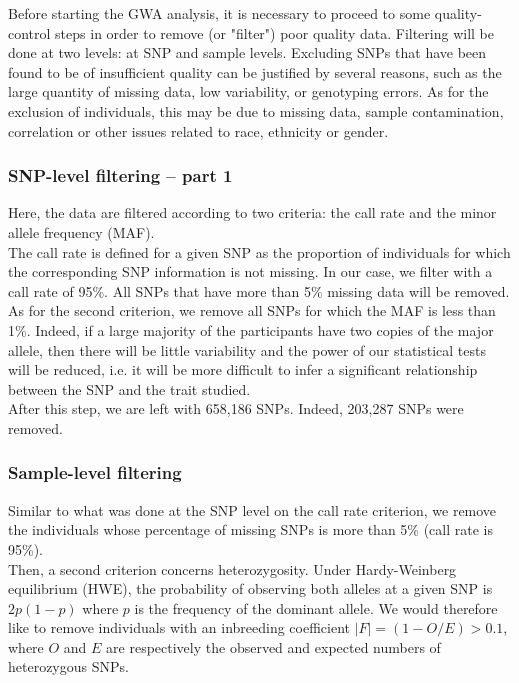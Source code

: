 \documentclass[a4paper, 12pt]{article}
\begin{document}
Before starting the GWA analysis, it is necessary to proceed to some quality-control steps in order to remove (or "filter") poor quality data. Filtering will be done at two levels: at SNP and sample levels. Excluding SNPs that have been found to be of insufficient quality can be justified by several reasons, such as the large quantity of missing data, low variability, or genotyping errors. As for the exclusion of individuals, this may be due to missing data, sample contamination, correlation or other issues related to race, ethnicity or gender. 

\subsubsection*{SNP-level filtering -- part 1}

Here, the data are filtered according to two criteria: the call rate and the minor allele frequency (MAF). \\

The call rate is defined for a given SNP as the proportion of individuals for which the corresponding SNP information is not missing. In our case, we filter with a call rate of 95\%. All SNPs that have more than 5\% missing data will be removed. \\

As for the second criterion, we remove all SNPs for which the MAF is less than 1\%. Indeed, if a large majority of the participants have two copies of the major allele, then there will be little variability and the power of our statistical tests will be reduced, i.e. it will be more difficult to infer a significant relationship between the SNP and the trait studied. \\

After this step, we are left with 658,186 SNPs. Indeed, 203,287 SNPs were removed. 

\subsubsection*{Sample-level filtering}

Similar to what was done at the SNP level on the call rate criterion, we remove the individuals whose percentage of missing SNPs is more than 5\% (call rate is 95\%). \\

Then, a second criterion concerns heterozygosity. Under Hardy-Weinberg equilibrium (HWE), the probability of observing both alleles at a given SNP is $2p(1-p)$ where $p$ is the frequency of the dominant allele. We would therefore like to remove individuals with an inbreeding coefficient $|F| = (1-O/E) >0.1$, where $O$ and $E$ are respectively the observed and expected numbers of heterozygous SNPs. \\
\end{document}
